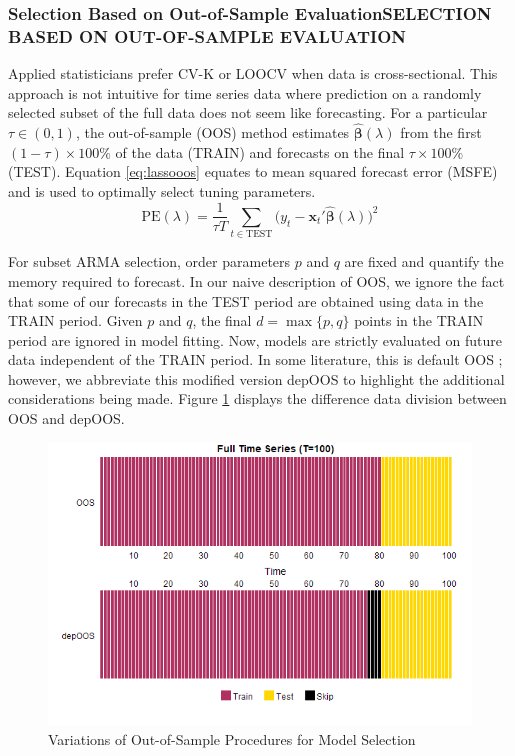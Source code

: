 \subsubsection{Selection Based on Out-of-Sample EvaluationSELECTION BASED ON OUT-OF-SAMPLE EVALUATION}

Applied statisticians prefer CV-K or LOOCV when data is cross-sectional. This approach is not intuitive for time series data where prediction on a randomly selected subset of the full data does not seem like forecasting. For a particular $\tau\in (0,1)$, the out-of-sample (OOS) method estimates $\hat{\bm{\beta}}(\lambda)$ from the first $(1-\tau)\times 100\%$ of the data (TRAIN) and forecasts on the final $\tau\times 100\%$ (TEST). Equation 
\ref{eq:lassooos} equates to mean squared forecast error (MSFE) and is used to optimally select tuning parameters. 
\begin{equation}
\label{eq:lassooos}
	\widehat{\textrm{PE}}(\lambda)=\frac{1}{\tau T}\sum\limits_{t\in \textrm{TEST}} \bigg(y_t-\bm{x}_t'\hat{\bm{\beta}}(\lambda)\bigg)^2
\end{equation}

For subset ARMA selection, order parameters $p$ and $q$ are fixed and quantify the memory required to forecast.  In our naive description of OOS, we ignore the fact that some of our forecasts in the TEST period are obtained using data in the TRAIN period. Given $p$ and $q$, the final $d=\max\{p,q\}$ points in the TRAIN period are ignored in model fitting. Now, models are strictly evaluated on future data independent of the TRAIN period. In some literature, this is default OOS \citep{Bergmeir2018}; however, we abbreviate this modified version depOOS to highlight the additional considerations being made. Figure \ref{fig:oosplots} displays the difference data division between OOS and depOOS.

\begin{figure}[htbp!]
	\caption{Variations of Out-of-Sample Procedures for Model Selection}
	\center
	\label{fig:oosplots}
	\includegraphics[scale=0.58]{oosplots}
\end{figure}


